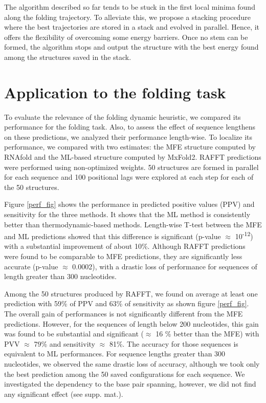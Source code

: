 \documentclass[a4paper,12pt]{article}
\begin{document}
The algorithm described so far tends to be stuck in the first local minima found
along the folding trajectory. To alleviate this, we propose a stacking procedure
where the best trajectories are stored in a stack and evolved in parallel.
Hence, it offers the flexibility of overcoming some energy barriers. Once no
stem can be formed, the algorithm stops and output the structure with the best
energy found among the structures saved in the stack.

\section*{Application to the folding task}
\label{sec:orge95f063}
To evaluate the relevance of the folding dynamic heuristic, we compared its
performance for the folding task. Also, to assess the effect of sequence
lengthens on these predictions, we analyzed their performance length-wise. To
localize its performance, we compared with two estimates: the MFE structure
computed by RNAfold and the ML-based structure computed by MxFold2. RAFFT
predictions were performed using non-optimized weights. 50 structures are formed
in parallel for each sequence and 100 positional lags were explored at each step
for each of the 50 structures.

Figure \ref{perf_fig} shows the performance in predicted positive values (PPV) and
sensitivity for the three methods. It shows that the ML method is consistently
better than thermodynamic-based methods. Length-wise T-test between the MFE and
ML predictions showed that this difference is significant (p-value \(\approx\)
10\textsuperscript{-12}) with a substantial improvement of about 10\%. Although RAFFT
predictions were found to be comparable to MFE predictions, they are
significantly less accurate (p-value \(\approx\) 0.0002), with a drastic loss of
performance for sequences of length greater than 300 nucleotides.

Among the 50 structures produced by RAFFT, we found on average at least one
prediction with 59\% of PPV and 63\% of sensitivity as shown figure \ref{perf_fig}.
The overall gain of performances is not significantly different from the MFE
predictions. However, for the sequences of length below 200 nucleotides, this
gain was found to be substantial and significant (\(\approx\) 16 \% better than the
MFE) with PVV \(\approx\) 79\% and sensitivity \(\approx\) 81\%. The accuracy for those
sequences is equivalent to ML performances. For sequence lengths greater than
300 nucleotides, we observed the same drastic loss of accuracy, although we took
only the best prediction among the 50 saved configurations for each sequence. We
investigated the dependency to the base pair spanning, however, we did not find
any significant effect (see supp. mat.).
\end{document}

